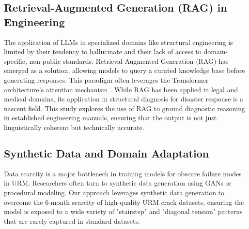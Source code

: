 \subsection{Retrieval-Augmented Generation (RAG) in Engineering}
\begin{sloppypar}
The application of LLMs in specialized domains like structural engineering is limited by their tendency to hallucinate and their lack of access to domain-specific, non-public standards. Retrieval-Augmented Generation (RAG) \cite{lewis2020retrieval} has emerged as a solution, allowing models to query a curated knowledge base before generating responses. This paradigm often leverages the Transformer architecture's attention mechanism \cite{vaswani2017attention}. While RAG has been applied in legal and medical domains, its application in structural diagnosis for disaster response is a nascent field. This study explores the use of RAG to ground diagnostic reasoning in established engineering manuals, ensuring that the output is not just linguistically coherent but technically accurate.
\end{sloppypar}

\subsection{Synthetic Data and Domain Adaptation}
\begin{sloppypar}
Data scarcity is a major bottleneck in training models for obscure failure modes in URM. Researchers often turn to synthetic data generation using GANs or procedural modeling. Our approach leverages synthetic data generation to overcome the 6-month scarcity of high-quality URM crack datasets, ensuring the model is exposed to a wide variety of "stairstep" and "diagonal tension" patterns that are rarely captured in standard datasets.
\end{sloppypar}
